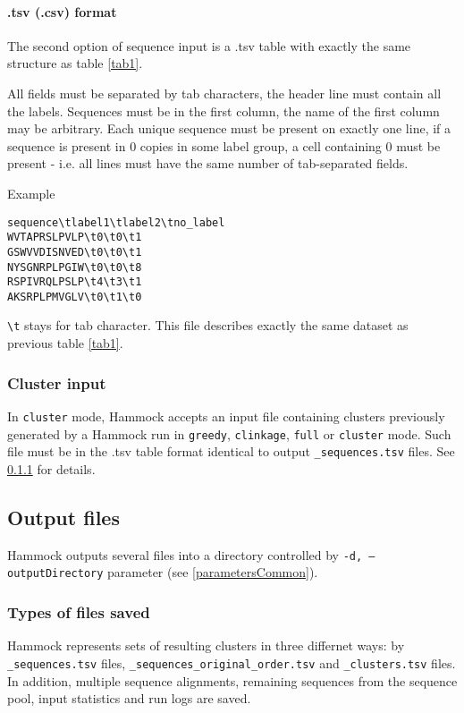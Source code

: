 \documentclass[11pt, a4paper, twoside, titlepage]{article}
\begin{document}
\paragraph{.tsv (.csv) format}
The second option of sequence input is a .tsv table with exactly the same structure as table \ref{tab1}.

All fields must be separated by tab characters, the header line must contain all the labels. Sequences must be in the first column, the name of the first column may be arbitrary. Each unique sequence must be present on exactly one line, if a sequence is present in 0 copies in some label group, a cell containing 0 must be present - i.e. all lines must have the same number of tab-separated fields. \newline

Example

\begin{verbatim}
sequence\tlabel1\tlabel2\tno_label
WVTAPRSLPVLP\t0\t0\t1
GSWVVDISNVED\t0\t0\t1
NYSGNRPLPGIW\t0\t0\t8
RSPIVRQLPSLP\t4\t3\t1
AKSRPLPMVGLV\t0\t1\t0
\end{verbatim}

\texttt{\textbackslash t} stays for tab character.
This file describes exactly the same dataset as previous table \ref{tab1}.

\subsubsection{Cluster input}
In \texttt{cluster} mode, Hammock accepts an input file containing clusters previously generated by a Hammock run in \texttt{greedy}, \texttt{clinkage}, \texttt{full} or \texttt{cluster} mode. Such file must be in the .tsv table format identical to output \texttt{\_sequences.tsv} files. See \ref{filesSaved} for details.


\subsection{Output files}

Hammock outputs several files into a directory controlled by \texttt{-d, --outputDirectory} parameter (see \ref{parametersCommon}).

\subsubsection{Types of files saved} \label{filesSaved}
Hammock represents sets of resulting clusters in three differnet ways: by \texttt{\_sequences.tsv} files, \texttt{\_sequences\_original\_order.tsv} and \texttt{\_clusters.tsv} files. In addition, multiple sequence alignments, remaining sequences from the sequence pool, input statistics and run logs are saved.
\end{document}

